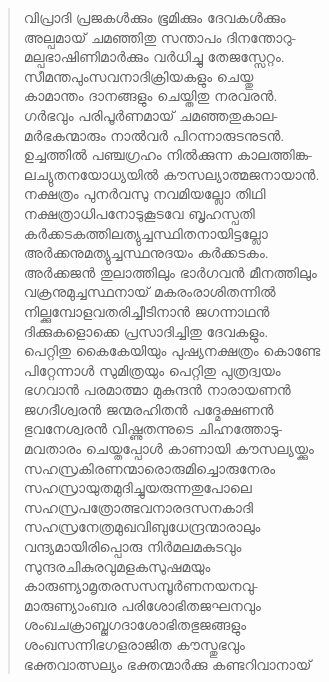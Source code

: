 \begin{verse}
വിപ്രാദി പ്രജകള്‍ക്കും ഭൂമിക്കും ദേവകള്‍ക്കും\\
അല്പമായ് ചമഞ്ഞിതു സന്താപം ദിനന്തോറു-\\
മല്പഭാഷിണിമാര്‍ക്കും വര്‍ധിച്ചു തേജസ്സേറ്റം.\\
സീമന്തപുംസവനാദിക്രിയകളും ചെയ്തു\\
കാമാന്തം ദാനങ്ങളും ചെയ്തിതു നരവരന്‍.\\
ഗര്‍ഭവും പരിപൂര്‍ണമായ് ചമഞ്ഞതുകാല-\\
മര്‍ഭകന്മാരും നാല്‍വര്‍ പിറന്നാരുടനുടന്‍.\\
ഉച്ചത്തില്‍ പഞ്ചഗ്രഹം നില്‍ക്കുന്ന കാലത്തിങ്ക-\\
ലച്യുതനയോധ്യയില്‍ കൗസല്യാത്മജനായാന്‍.\\
നക്ഷത്രം പുനര്‍വസു നവമിയല്ലോ തിഥി\\
നക്ഷത്രാധിപനോടുകൂടവേ ബൃഹസ്പതി\\
കര്‍ക്കടകത്തിലത്യുച്ചസ്ഥിതനായിട്ടല്ലോ\\
അര്‍ക്കനുമത്യുച്ചസ്ഥനുദയം കര്‍ക്കടകം.\\
അര്‍ക്കജന്‍ തുലാത്തിലും ഭാര്‍ഗവന്‍ മീനത്തിലും\\
വക്രനുമുച്ചസ്ഥനായ് മകരംരാശിതന്നില്‍\\
നില്ക്കുമ്പോളവതരിച്ചീടിനാന്‍ ജഗന്നാഥന്‍\\
ദിക്കുകളൊക്കെ പ്രസാദിച്ചിതു ദേവകളും.\\
പെറ്റിതു കൈകേയിയും പുഷ്യനക്ഷത്രം കൊണ്ടേ\\
പിറ്റേന്നാള്‍ സുമിത്രയും പെറ്റിതു പുത്രദ്വയം\\
ഭഗവാന്‍ പരമാത്മാ മുകുന്ദന്‍ നാരായണന്‍\\
ജഗദീശ്വരന്‍ ജന്മരഹിതന്‍ പദ്മേക്ഷണന്‍\\
ഭുവനേശ്വരന്‍ വിഷ്ണുതന്നുടെ ചിഹ്നത്തോടു-\\
മവതാരം ചെയ്തപ്പോള്‍ കാണായി കൗസല്യയ്ക്കും\\
സഹസ്രകിരണന്മാരൊരുമിച്ചൊരുനേരം\\
സഹസ്രായുതമുദിച്ചുയരുന്നതുപോലെ\\
സഹസ്രപത്രോത്ഭവനാരദസനകാദി\\
സഹസ്രനേത്രമുഖവിബുധേന്ദ്രന്മാരാലും\\
വന്ദ്യമായിരിപ്പൊരു നിര്‍മലമകുടവും\\
സുന്ദരചികുരവുമളകസുഷമയും\\
കാരുണ്യാമൃതരസസമ്പൂര്‍ണനയനവു-\\
മാരുണ്യാംബര പരിശോഭിതജഘനവും\\
ശംഖചക്രാബ്ജഗദാശോഭിതഭുജങ്ങളും\\
ശംഖസന്നിഭഗളരാജിത കൗസ്തുഭവും\\
ഭക്തവാത്സല്യം ഭക്തന്മാര്‍ക്കു കണ്ടറിവാനായ്\\

\end{verse}
